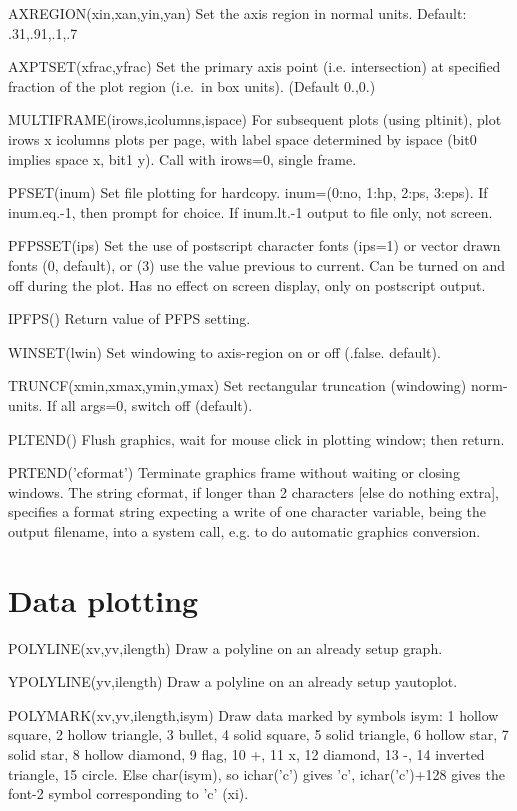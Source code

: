 \documentclass[12pt]{article}
\begin{document}
AXREGION(xin,xan,yin,yan) Set the axis region in normal units.
Default: .31,.91,.1,.7

AXPTSET(xfrac,yfrac) Set the primary axis point (i.e. intersection) at specified
fraction of the plot region (i.e.\ in box units). (Default 0.,0.)

MULTIFRAME(irows,icolumns,ispace) For subsequent plots (using pltinit),
plot irows x icolumns plots per page, with label space determined by
ispace (bit0 implies space x, bit1 y). Call with irows=0, single frame.

PFSET(inum) Set file plotting for hardcopy. inum=(0:no, 1:hp, 2:ps, 3:eps).
If inum.eq.-1, then prompt for choice. If inum.lt.-1 output to file
only, not screen.

PFPSSET(ips) Set the use of postscript character fonts (ips=1) or vector
drawn fonts (0, default), or (3) use the value previous to current.
Can be turned on and off during the plot. Has no effect on screen
display, only on postscript output.

IPFPS() Return value of PFPS setting.

WINSET(lwin) Set windowing to axis-region on or off (.false. default).

TRUNCF(xmin,xmax,ymin,ymax) Set rectangular truncation (windowing) norm-units.
If all args=0, switch off (default).

PLTEND() Flush graphics, wait for mouse click in plotting window; then
return.

PRTEND('cformat') Terminate graphics frame without waiting or closing
windows. The string cformat, if longer than 2 characters [else do
nothing extra], specifies a format string expecting a write of one
character variable, being the output filename, into a system call,
e.g. to do automatic graphics conversion.

\section{Data plotting}

POLYLINE(xv,yv,ilength) Draw a polyline on an already setup graph.

YPOLYLINE(yv,ilength) Draw a polyline on an already setup yautoplot.

POLYMARK(xv,yv,ilength,isym) Draw data marked by symbols isym:
1 hollow square, 2 hollow triangle, 3 bullet, 4 solid square, 5 solid 
triangle, 6 hollow star, 7 solid star, 8 hollow diamond, 9 flag, 10 +,
11 x, 12 diamond, 13 -, 14 inverted triangle, 15 circle. Else
char(isym), so ichar('c') gives 'c', ichar('c')+128 gives the font-2
symbol corresponding to 'c' (xi).
\end{document}

